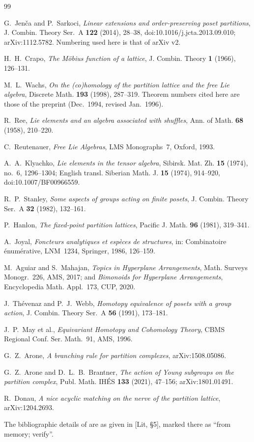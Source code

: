 \documentclass[11pt]{article}
\theoremstyle{definition}
\theoremstyle{remark}
\begin{document}
\begin{thebibliography}{99}

G.~Jen\v{c}a and P.~Sarkoci,
\emph{Linear extensions and order-preserving poset partitions},
J. Combin. Theory Ser.~A \textbf{122} (2014), 28--38,
doi:10.1016/j.jcta.2013.09.010; arXiv:1112.5782. Numbering used here is that
of arXiv v2.

H.~H.~Crapo, \emph{The M\"obius function of a lattice},
J. Combin. Theory \textbf{1} (1966), 126--131.

M.~L.~Wachs,
\emph{On the (co)homology of the partition lattice and the free Lie algebra},
Discrete Math. \textbf{193} (1998), 287--319. Theorem numbers cited here are
those of the preprint (Dec.~1994, revised Jan.~1996).

R.~Ree, \emph{Lie elements and an algebra associated with shuffles},
Ann. of Math. \textbf{68} (1958), 210--220.

C.~Reutenauer, \emph{Free Lie Algebras}, LMS Monographs~7, Oxford, 1993.

A.~A.~Klyachko, \emph{Lie elements in the tensor algebra},
Sibirsk. Mat. Zh. \textbf{15} (1974), no.~6, 1296--1304; English transl.
Siberian Math. J. \textbf{15} (1974), 914--920, doi:10.1007/BF00966559.

R.~P.~Stanley, \emph{Some aspects of groups acting on finite posets},
J. Combin. Theory Ser.~A \textbf{32} (1982), 132--161.

P.~Hanlon, \emph{The fixed-point partition lattices},
Pacific J. Math. \textbf{96} (1981), 319--341.

A.~Joyal, \emph{Foncteurs analytiques et esp\`eces de structures},
in: Combinatoire \'enum\'erative, LNM~1234, Springer, 1986, 126--159.

M.~Aguiar and S.~Mahajan, \emph{Topics in Hyperplane Arrangements},
Math. Surveys Monogr.~226, AMS, 2017; and \emph{Bimonoids for Hyperplane
Arrangements}, Encyclopedia Math. Appl.~173, CUP, 2020.

J.~Th\'evenaz and P.~J.~Webb, \emph{Homotopy equivalence of posets with a
group action}, J. Combin. Theory Ser.~A \textbf{56} (1991), 173--181.

J.~P.~May et al., \emph{Equivariant Homotopy and Cohomology Theory}, CBMS
Regional Conf. Ser. Math.~91, AMS, 1996.

G.~Z.~Arone, \emph{A branching rule for partition complexes},
arXiv:1508.05086.

G.~Z.~Arone and D.~L.~B.~Brantner, \emph{The action of Young subgroups on
the partition complex}, Publ. Math. IH\'ES \textbf{133} (2021), 47--156;
arXiv:1801.01491.

R.~Donau, \emph{A nice acyclic matching on the nerve of the partition
lattice}, arXiv:1204.2693.

\end{thebibliography}

\noindent The bibliographic details of \cite{Stanley82,Hanlon81,Joyal86} are
as given in [Lit, \S5], marked there as ``from memory; verify''.
\end{document}
